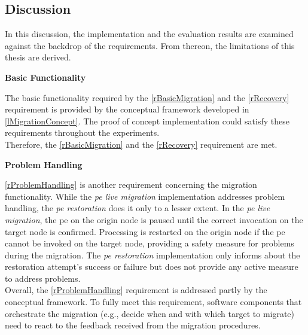 \subsection{Discussion}
\label{lDiscussion}

In this discussion, the implementation and the evaluation results are examined against the backdrop of the requirements. From thereon, the limitations of this thesis are derived.\par

\textbf{Basic Functionality}\par
The basic functionality required by the \ref{rBasicMigration} and the \ref{rRecovery} requirement is provided by the conceptual framework developed in \ref{lMigrationConcept}. The proof of concept implementation could satisfy these requirements throughout the experiments.\\
Therefore, the \ref{rBasicMigration} and the \ref{rRecovery} requirement are met.\par

\textbf{Problem Handling}\par
\ref{rProblemHandling} is another requirement concerning the migration functionality. While the \textit{\acrshort{pe} live migration} implementation addresses problem handling, the \textit{\acrshort{pe} restoration} does it only to a lesser extent. 
In the \textit{\acrshort{pe} live migration}, the \gls{pe} on the origin node is paused until the correct invocation on the target node is confirmed. Processing is restarted on the origin node if the \gls{pe} cannot be invoked on the target node, providing a safety measure for problems during the migration. The \textit{\acrshort{pe} restoration} implementation only informs about the restoration attempt's success or failure but does not provide any active measure to address problems.\\
Overall, the \ref{rProblemHandling} requirement is addressed partly by the conceptual framework. To fully meet this requirement, software components that orchestrate the migration (e.g., decide when and with which target to migrate) need to react to the feedback received from the migration procedures.\par


